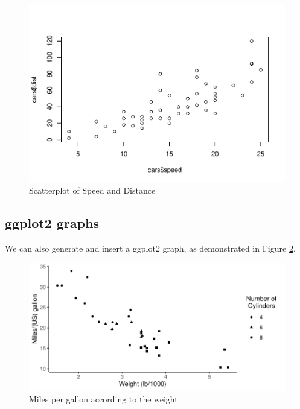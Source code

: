 \documentclass[
  12pt,
]{article}
\begin{document}
\begin{figure}[H]

{\centering \includegraphics{paper_files/figure-latex/fig-1-1} 

}

\caption{Scatterplot of Speed and Distance}\label{fig:fig-1}
\end{figure}

\hypertarget{ggplot2-graphs}{%
\subsection{ggplot2 graphs}\label{ggplot2-graphs}}

We can also generate and insert a ggplot2 graph, as demonstrated in Figure \ref{fig:fig-2}.

\begin{figure}[H]

{\centering \includegraphics{paper_files/figure-latex/fig-2-1} 

}

\caption{Miles per gallon according to the weight}\label{fig:fig-2}
\end{figure}
\end{document}
